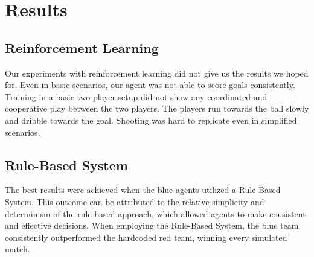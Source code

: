 \section{Results}
\label{section:results}

\subsection{Reinforcement Learning}
Our experiments with reinforcement learning did not give us the results we hoped for.  
Even in basic scenarios, our agent was not able to score goals consistently.  
Training in a basic two-player setup did not show any coordinated and cooperative play between the two players.  
The players run towards the ball slowly and dribble towards the goal.  
Shooting was hard to replicate even in simplified scenarios.  

\subsection{Rule-Based System}
The best results were achieved when the blue agents utilized a Rule-Based System. This outcome can be attributed to the relative simplicity and determinism of the rule-based approach, which allowed agents to make consistent and effective decisions. When employing the Rule-Based System, the blue team consistently outperformed the hardcoded red team, winning every simulated match.
